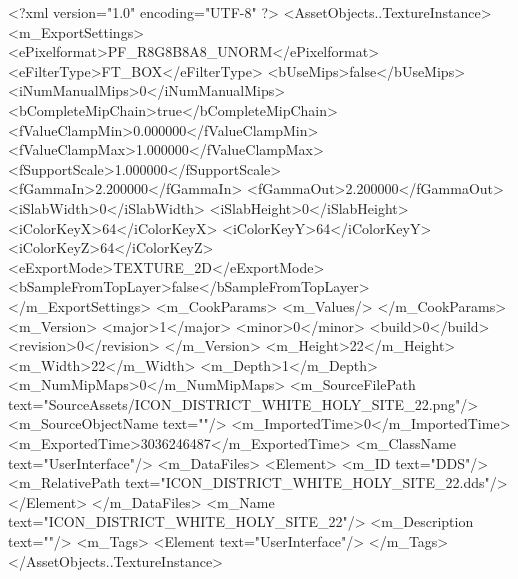 <?xml version="1.0" encoding="UTF-8" ?>
<AssetObjects..TextureInstance>
	<m_ExportSettings>
		<ePixelformat>PF_R8G8B8A8_UNORM</ePixelformat>
		<eFilterType>FT_BOX</eFilterType>
		<bUseMips>false</bUseMips>
		<iNumManualMips>0</iNumManualMips>
		<bCompleteMipChain>true</bCompleteMipChain>
		<fValueClampMin>0.000000</fValueClampMin>
		<fValueClampMax>1.000000</fValueClampMax>
		<fSupportScale>1.000000</fSupportScale>
		<fGammaIn>2.200000</fGammaIn>
		<fGammaOut>2.200000</fGammaOut>
		<iSlabWidth>0</iSlabWidth>
		<iSlabHeight>0</iSlabHeight>
		<iColorKeyX>64</iColorKeyX>
		<iColorKeyY>64</iColorKeyY>
		<iColorKeyZ>64</iColorKeyZ>
		<eExportMode>TEXTURE_2D</eExportMode>
		<bSampleFromTopLayer>false</bSampleFromTopLayer>
	</m_ExportSettings>
	<m_CookParams>
		<m_Values/>
	</m_CookParams>
	<m_Version>
		<major>1</major>
		<minor>0</minor>
		<build>0</build>
		<revision>0</revision>
	</m_Version>
	<m_Height>22</m_Height>
	<m_Width>22</m_Width>
	<m_Depth>1</m_Depth>
	<m_NumMipMaps>0</m_NumMipMaps>
	<m_SourceFilePath text="SourceAssets/ICON_DISTRICT_WHITE_HOLY_SITE_22.png"/>
	<m_SourceObjectName text=""/>
	<m_ImportedTime>0</m_ImportedTime>
	<m_ExportedTime>3036246487</m_ExportedTime>
	<m_ClassName text="UserInterface"/>
	<m_DataFiles>
		<Element>
			<m_ID text="DDS"/>
			<m_RelativePath text="ICON_DISTRICT_WHITE_HOLY_SITE_22.dds"/>
		</Element>
	</m_DataFiles>
	<m_Name text="ICON_DISTRICT_WHITE_HOLY_SITE_22"/>
	<m_Description text=""/>
	<m_Tags>
		<Element text="UserInterface"/>
	</m_Tags>
</AssetObjects..TextureInstance>

